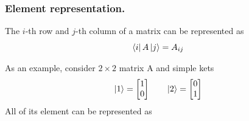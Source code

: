 \documentclass[../../../main.tex]{subfiles}
\begin{document}
\subsubsection{Element representation.}
The $i$-th row and $j$-th column of a matrix can be represented as
\begin{equation*}
	\bra{i }A \ket{j }=A_{ij}
\end{equation*}

As an example, consider $2 \times 2$ matrix A and simple kets
\begin{equation*}
	\ket{1}=
	\begin{bmatrix}
		1 \\
		0
	\end{bmatrix}
	\qquad
	\ket{2}=
	\begin{bmatrix}
		0 \\
		1
	\end{bmatrix}
\end{equation*}
All of its element can be represented as
\end{document}
